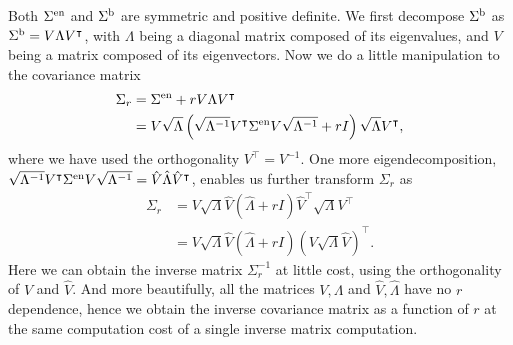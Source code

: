 \documentclass[aps, prd, reprint, nofootinbib, groupedaddress, showpacs]{revtex4-1}
\def\be{\begin{equation}}
\def\ee{\end{equation}}
\begin{document}
Both $\Sigma^{\rm en}$ and $\Sigma^{\rm b}$ are symmetric and positive definite.
We first decompose $\Sigma^{\rm b}$ as $\Sigma^{\rm b} = V\Lambda V^\intercal$,
with $\Lambda$ being a diagonal matrix composed of its eigenvalues,
and $V$ being a matrix composed of its eigenvectors.
Now we do a little manipulation to the covariance matrix
\be
\begin{aligned}
\Sigma_r
&= \Sigma^{\rm en}  + r V\Lambda V^\intercal \\
&= V\sqrt{\Lambda} \left(\sqrt{\Lambda^{-1}}V^\intercal \Sigma^{\rm en}V\sqrt{\Lambda^{-1}}  + r I\right) \sqrt{\Lambda} V^\intercal,
\end{aligned}
\ee
where we have used the orthogonality $V^\intercal = V^{-1}$. One more eigendecomposition,
$\sqrt{\Lambda^{-1}}V^\intercal \Sigma^{\rm en} V\sqrt{\Lambda^{-1}} = \hat V \hat \Lambda \hat V^\intercal$,
enables us further transform $\Sigma_r$ as
\be
\begin{aligned}
\Sigma_r
&= V\sqrt{\Lambda}\hat V \left( \hat \Lambda + r I\right)  \hat V^\intercal \sqrt{\Lambda} V^\intercal\\
&= V\sqrt{\Lambda}\hat V \left( \hat \Lambda + r I\right)  (V\sqrt{\Lambda}\hat V )^\intercal.
\end{aligned}
\ee
Here we can obtain the inverse matrix $\Sigma_r^{-1}$ at little cost, using the orthogonality of $V$ and $\hat V$.
And more beautifully,  all the matrices $V, \Lambda$ and $\hat V, \hat\Lambda$ have no $r$ dependence,
hence we obtain the inverse covariance matrix as a function of $r$ at the same computation cost
of a single inverse matrix computation.
\end{document}
